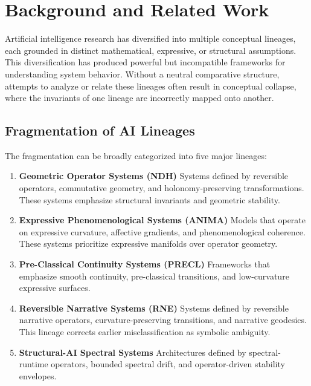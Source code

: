 
\section{Background and Related Work}
\label{sec:background}

Artificial intelligence research has diversified into multiple conceptual
lineages, each grounded in distinct mathematical, expressive, or structural
assumptions. This diversification has produced powerful but incompatible
frameworks for understanding system behavior. Without a neutral comparative
structure, attempts to analyze or relate these lineages often result in
conceptual collapse, where the invariants of one lineage are incorrectly mapped
onto another.

\subsection{Fragmentation of AI Lineages}

The fragmentation can be broadly categorized into five major lineages:

\begin{enumerate}
    \item \textbf{Geometric Operator Systems (NDH)}  
    Systems defined by reversible operators, commutative geometry, and
    holonomy-preserving transformations. These systems emphasize structural
    invariants and geometric stability.

    \item \textbf{Expressive Phenomenological Systems (ANIMA)}  
    Models that operate on expressive curvature, affective gradients, and
    phenomenological coherence. These systems prioritize expressive manifolds
    over operator geometry.

    \item \textbf{Pre-Classical Continuity Systems (PRECL)}  
    Frameworks that emphasize smooth continuity, pre-classical transitions, and
    low-curvature expressive surfaces.

    \item \textbf{Reversible Narrative Systems (RNE)}  
    Systems defined by reversible narrative operators, curvature-preserving
    transitions, and narrative geodesics. This lineage corrects earlier
    misclassification as symbolic ambiguity.

    \item \textbf{Structural-AI Spectral Systems}  
    Architectures defined by spectral-runtime operators, bounded spectral drift,
    and operator-driven stability envelopes.
\end{enumerate}


